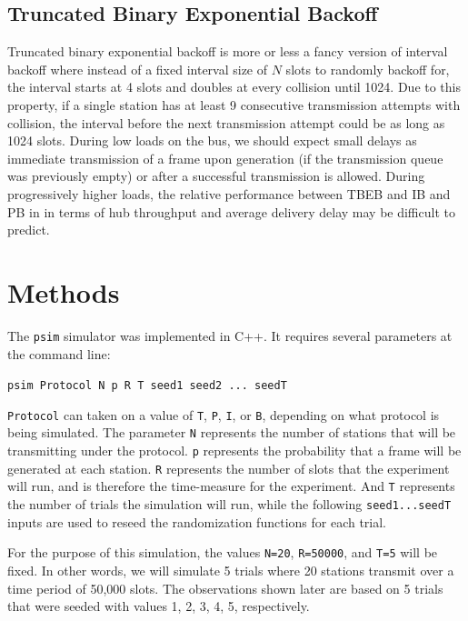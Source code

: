 \documentclass[twocolumn]{article}
\begin{document}
\subsection*{Truncated Binary Exponential Backoff}

Truncated binary exponential backoff is more or less a fancy version of interval backoff 
where instead of a fixed interval size of $N$ slots to randomly backoff for, the interval
starts at 4 slots and doubles at every collision until 1024. Due to this property, if a
single station has at least 9 consecutive transmission attempts with collision, 
the interval before the next transmission attempt could be as long as 1024 slots. During low
loads on the bus, we should expect small delays as immediate transmission of a frame upon 
generation (if the transmission queue was previously empty) or after a successful transmission
is allowed. During progressively higher loads, the relative performance between TBEB and IB and PB in
in terms of hub throughput and average delivery delay may be difficult to predict. 

\section*{Methods}

The \verb|psim| simulator was implemented in C++. It requires several parameters
at the command line:

\begin{center}\verb|psim Protocol N p R T seed1 seed2 ... seedT|\end{center}

 \verb|Protocol| can taken on a value of \verb|T|, \verb|P|, \verb|I|, or \verb|B|, depending on
what protocol is being simulated. The parameter \verb|N| represents the number of
stations that will be transmitting under the protocol. \verb|p| represents the
probability that a frame will be generated at each station. \verb|R| represents the
number of slots that the experiment will run, and is therefore the time-measure
for the experiment. And \verb|T| represents the number of trials the simulation will
run, while the following \verb|seed1...seedT| inputs are used to reseed the
randomization functions for each trial. 

For the purpose of this simulation, the
values \verb|N=20|, \verb|R=50000|, and \verb|T=5| will be fixed. In other words, we will
simulate 5 trials where 20 stations transmit over a time period of 50,000 slots.
The observations shown later are based on 5 trials that were seeded with values
1, 2, 3, 4, 5, respectively.
\end{document}
